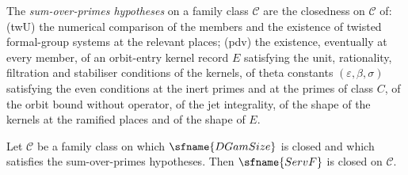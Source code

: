 The \emph{sum-over-primes hypotheses} on a family class $\mathcal C$ are the closedness on $\mathcal C$ of: (twU) the
numerical comparison of the members and the existence of twisted formal-group systems at the relevant places; (pdv)
the existence, eventually at every member, of an orbit-entry kernel record $E$ satisfying the unit, rationality,
filtration and stabiliser conditions of the kernels, of theta constants $(\varepsilon,\beta,\sigma)$ satisfying the
even conditions at the inert primes and at the primes of class $C$, of the orbit bound without operator, of the jet
integrality, of the shape of the kernels at the ramified places and of the shape of $E$.

\begin{theorem}\label{pf:top-shape:serv}
Let $\mathcal C$ be a family class on which $\sfname{DGamSize}$ is closed and which satisfies the sum-over-primes
hypotheses. Then $\sfname{ServF}$ is closed on $\mathcal C$.
\end{theorem}

